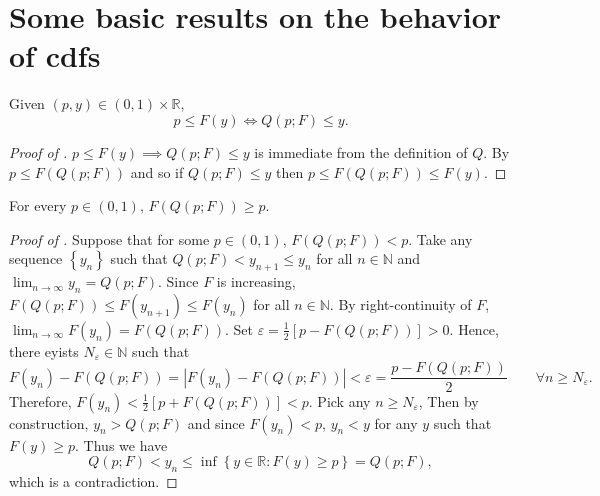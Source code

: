 
\section{Some basic results on the behavior of cdfs}
\label{sec--cdf-behavior}

\begin{lemma}
\label{lem--p-leq-Fy-iff-Qp-leq-y}
Given \((p, y) \in (0, 1) \times \mathbb{R}\),
\begin{equation}
  p \leq F (y) \iff Q (p; F) \leq y.
  \label{eqn--p-leq-Fy-iff-Qp-leq-y}
\end{equation}
\end{lemma}

\begin{proof}[Proof of ]
\(p \leq F (y) \implies Q (p; F) \leq y\) is immediate from the definition of
\(Q\).
By  \(p \leq F (Q (p; F))\) and so if \(Q (p; F) \leq y\)
then \(p \leq F (Q (p; F)) \leq F (y)\).
\end{proof}

\begin{lemma}
\label{lem--FQ-geq-p}
For every \(p \in (0, 1)\), \(F (Q (p; F)) \geq p\).
\end{lemma}

\begin{proof}[Proof of ]
Suppose that for some \(p \in (0, 1)\), \(F (Q (p; F)) < p\).
Take any sequence \(\left\{ y_{n} \right\}\) such that \(Q (p; F) < y_{n + 1}
\leq y_{n}\) for all \(n \in \mathbb{N}\) and \(\lim_{n \to
\infty} y_{n} = Q (p; F)\).
Since \(F\) is increasing, \(F (Q (p; F)) \leq F \left( y_{n + 1} \right) \leq F
\left( y_{n} \right)\) for all \(n \in \mathbb{N}\).
By right-continuity of \(F\), \(\lim_{n \to \infty} F \left( y_{n} \right) = F
(Q (p; F))\).
Set \(\varepsilon = \frac{1}{2} [p - F (Q (p; F))] > 0\).
Hence, there eyists \(N_{\varepsilon} \in \mathbb{N}\) such that
\begin{equation}
  F \left( y_{n} \right) - F (Q (p; F)) = \left| F \left( y_{n} \right) - F (Q
  (p; F)) \right| < \varepsilon = \frac{p - F (Q (p; F))}{2} \qquad \forall n
  \geq N_{\varepsilon}.
\end{equation}
Therefore, \(F \left( y_{n} \right) < \frac{1}{2} [p + F (Q (p; F))] < p\).
Pick any \(n \geq N_{\varepsilon}\),
Then by construction, \(y_{n} > Q (p; F)\) and since \(F \left( y_{n} \right) <
p\), \(y_{n} < y\) for any \(y\) such that \(F (y) \geq p\).
Thus we have
\begin{equation*}
  Q (p; F) < y_{n} \leq \inf \left\{ y \in \mathbb{R} : F (y) \geq p \right\} =
  Q (p; F),
\end{equation*}
which is a contradiction.
\end{proof}

